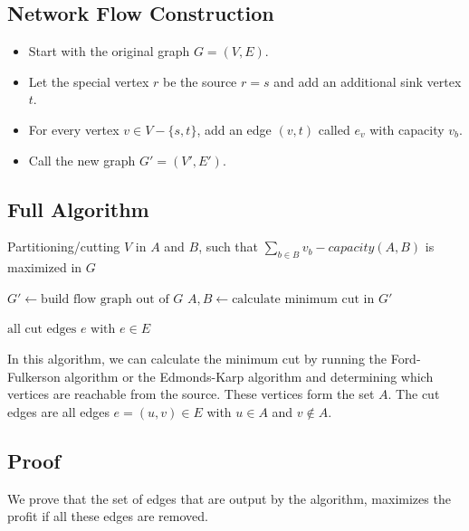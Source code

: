 \documentclass[12pt]{article}
\begin{document}
\subsection*{Network Flow Construction}
\begin{itemize}
	\item Start with the original graph $G=(V,E)$.
	\item Let the special vertex $r$ be the source $r=s$ and add an additional sink vertex $t$.
	\item For every vertex $v \in V - \{s, t\}$, add an edge $(v, t)$ called $e_v$ with capacity $v_b$.
	\item Call the new graph $G' = (V', E')$.
\end{itemize}

\subsection*{Full Algorithm}
\begin{algorithm}
  \caption{Partitioning/cutting $V$ in $A$ and $B$, such that $\sum_{b \in B} v_b - \mathit{capacity}(A,B)$ is maximized in $G$}
  \begin{algorithmic}[1]
		\State $G' \gets \mbox{build flow graph out of $G$}$
		\State $A,B \gets \mbox{calculate minimum cut in $G'$}$
		
		\State \Return $\mbox{all cut edges $e$ with $e \in E$}$
    \EndFunction
  \end{algorithmic}
\end{algorithm}

In this algorithm, we can calculate the minimum cut by running the Ford-Fulkerson algorithm or the Edmonds-Karp algorithm and determining which vertices are reachable from the source. These vertices form the set $A$. The cut edges are all edges $e=(u,v) \in E$ with $u \in A$ and $v \not \in  A$.

\subsection*{Proof}
We prove that the set of edges that are output by the algorithm, maximizes the profit if all these edges are removed.
\end{document}
